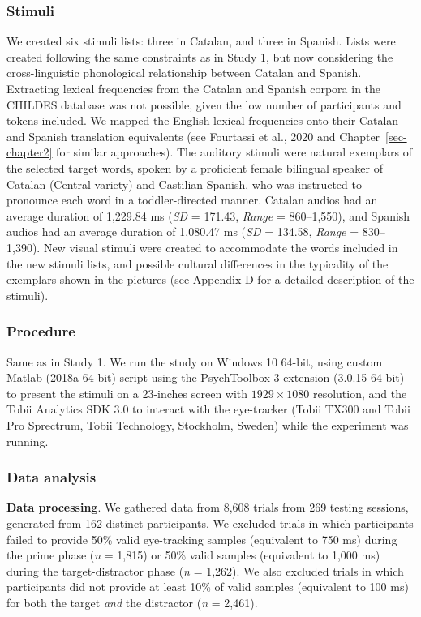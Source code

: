 \documentclass[
  12pt,
  b5paperpaper,
  twoside]{scrreprt}
\begin{document}
\hypertarget{stimuli-1}{%
\subsubsection{Stimuli}\label{stimuli-1}}

We created six stimuli lists: three in Catalan, and three in Spanish.
Lists were created following the same constraints as in Study 1, but now
considering the cross-linguistic phonological relationship between
Catalan and Spanish. Extracting lexical frequencies from the Catalan and
Spanish corpora in the CHILDES database was not possible, given the low
number of participants and tokens included. We mapped the English
lexical frequencies onto their Catalan and Spanish translation
equivalents (see Fourtassi et al., 2020 and Chapter~\ref{sec-chapter2}
for similar approaches). The auditory stimuli were natural exemplars of
the selected target words, spoken by a proficient female bilingual
speaker of Catalan (Central variety) and Castilian Spanish, who was
instructed to pronounce each word in a toddler-directed manner. Catalan
audios had an average duration of 1,229.84 ms (\emph{SD} = 171.43,
\emph{Range} = 860--1,550), and Spanish audios had an average duration
of 1,080.47 ms (\emph{SD} = 134.58, \emph{Range} = 830--1,390). New
visual stimuli were created to accommodate the words included in the new
stimuli lists, and possible cultural differences in the typicality of
the exemplars shown in the pictures (see Appendix D for a detailed
description of the stimuli).

\hypertarget{procedure-1}{%
\subsubsection{Procedure}\label{procedure-1}}

Same as in Study 1. We run the study on Windows 10 64-bit, using custom
Matlab (2018a 64-bit) script using the PsychToolbox-3 extension (3.0.15
64-bit) to present the stimuli on a 23-inches screen with
\(1929\times1080\) resolution, and the Tobii Analytics SDK 3.0 to
interact with the eye-tracker (Tobii TX300 and Tobii Pro Sprectrum,
Tobii Technology, Stockholm, Sweden) while the experiment was running.

\hypertarget{data-analysis-1}{%
\subsubsection{Data analysis}\label{data-analysis-1}}

\textbf{Data processing}. We gathered data from 8,608 trials from 269
testing sessions, generated from 162 distinct participants. We excluded
trials in which participants failed to provide 50\% valid eye-tracking
samples (equivalent to 750 ms) during the prime phase (\emph{n} = 1,815)
or 50\% valid samples (equivalent to 1,000 ms) during the
target-distractor phase (\emph{n} = 1,262). We also excluded trials in
which participants did not provide at least 10\% of valid samples
(equivalent to 100 ms) for both the target \emph{and} the distractor
(\emph{n} = 2,461).
\end{document}
